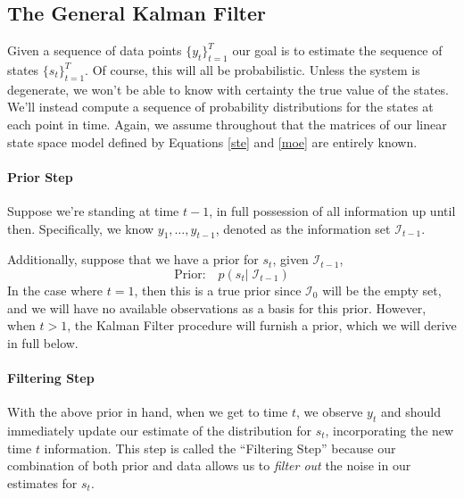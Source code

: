 \documentclass[a4paper,12pt]{article}
\begin{document}
\subsection{The General Kalman Filter}

Given a sequence of data points $\{y_t\}_{t=1}^T$ our goal is to estimate the sequence of states $\{s_t\}^T_{t=1}$. Of course, this will all be probabilistic. Unless the system is degenerate, we won't be able to know with certainty the true value of the states. We'll instead compute a sequence of probability distributions for the states at each point in time. Again, we assume throughout that the matrices of our linear state space model defined by Equations \ref{ste} and \ref{moe} are entirely known.


\paragraph{Prior Step} Suppose we're standing at time $t-1$, in full possession of all information up until then. Specifically, we know $y_1, \ldots, y_{t-1}$, denoted as the information set $\mathcal{I}_{t-1}$. 

Additionally, suppose that we have a prior for $s_t$, given $\mathcal{I}_{t-1}$,
\begin{equation}
  \text{Prior:} \quad p(s_t | \; \mathcal{I}_{t-1}) 
  \label{pri}
\end{equation}
In the case where $t=1$, then this is a true prior since $\mathcal{I}_{0}$ will be the empty set, and we will have no available observations as a basis for this prior. However, when $t>1$, the Kalman Filter procedure will furnish a prior, which we will derive in full below.

\paragraph{Filtering Step}
With the above prior in hand, when we get to time $t$, we observe $y_t$ and should immediately update our estimate of the distribution for $s_t$, incorporating the new time $t$ information. This step is called the ``Filtering Step'' because our combination of both prior and data allows us to \emph{filter out} the noise in our estimates for $s_t$. 
\end{document}
